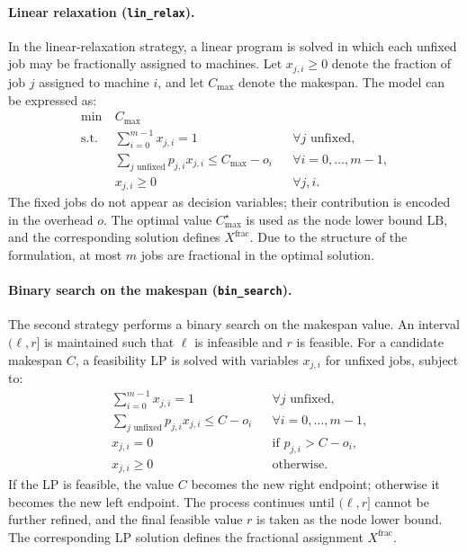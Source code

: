 \paragraph{Linear relaxation (\texttt{lin\_relax}).}
In the linear-relaxation strategy, a linear program is solved in which each unfixed job may be fractionally assigned to machines.
Let \(x_{j,i} \ge 0\) denote the fraction of job \(j\) assigned to machine \(i\), and let \(C_{\max}\) denote the makespan.
The model can be expressed as:
\begin{align*}
  \min\ & C_{\max} \\
  \text{s.t. }
  & \sum_{i=0}^{m-1} x_{j,i} = 1 && \forall j \text{ unfixed}, \\
  & \sum_{j \text{ unfixed}} p_{j,i} x_{j,i} \le C_{\max} - o_i && \forall i = 0,\dots,m-1, \\
  & x_{j,i} \ge 0 && \forall j,i.
\end{align*}
The fixed jobs do not appear as decision variables; their contribution is encoded in the overhead \(o\).
The optimal value \(C_{\max}^{\star}\) is used as the node lower bound \(\text{LB}\), and the corresponding solution defines \(X^{\text{frac}}\).
Due to the structure of the formulation, at most \(m\) jobs are fractional in the optimal solution.

\paragraph{Binary search on the makespan (\texttt{bin\_search}).}
The second strategy performs a binary search on the makespan value.
An interval \((\ell, r]\) is maintained such that \(\ell\) is infeasible and \(r\) is feasible.
For a candidate makespan \(C\), a feasibility LP is solved with variables \(x_{j,i}\) for unfixed jobs, subject to:
\begin{align*}
  & \sum_{i=0}^{m-1} x_{j,i} = 1 && \forall j \text{ unfixed}, \\
  & \sum_{j \text{ unfixed}} p_{j,i} x_{j,i} \le C - o_i && \forall i = 0,\dots,m-1, \\
  & x_{j,i} = 0 && \text{if } p_{j,i} > C - o_i, \\
  & x_{j,i} \ge 0 && \text{otherwise}.
\end{align*}
If the LP is feasible, the value \(C\) becomes the new right endpoint; otherwise it becomes the new left endpoint.
The process continues until \((\ell, r]\) cannot be further refined, and the final feasible value \(r\) is taken as the node lower bound.
The corresponding LP solution defines the fractional assignment \(X^{\text{frac}}\).

